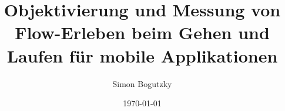 \title{Objektivierung und Messung von Flow-Erleben beim Gehen und Laufen für mobile Applikationen}
\author{Simon Bogutzky}
\date{\today}

